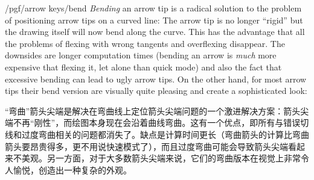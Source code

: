 \begin{key}{/pgf/arrow keys/bend}
    \emph{Bending} an arrow tip is a radical solution to the problem of
    positioning arrow tips on a curved line: The arrow tip is no longer
    ``rigid'' but the drawing itself will now bend along the curve. This has
    the advantage that all the problems of flexing with wrong tangents and
    overflexing disappear. The downsides are longer computation times (bending
    an arrow is \emph{much} more expensive that flexing it, let alone than
    quick mode) and also the fact that excessive bending can lead to ugly arrow
    tips. On the other hand, for most arrow tips their bend version are
    visually quite pleasing and create a sophisticated look:
    
    “弯曲”箭头尖端是解决在弯曲线上定位箭头尖端问题的一个激进解决方案：箭头尖端不再“刚性”，而绘图本身现在会沿着曲线弯曲。这有一个优点，即所有与错误切线和过度弯曲相关的问题都消失了。缺点是计算时间更长（弯曲箭头的计算比弯曲箭头要昂贵得多，更不用说快速模式了），而且过度弯曲可能会导致箭头尖端看起来不美观。另一方面，对于大多数箭头尖端来说，它们的弯曲版本在视觉上非常令人愉悦，创造出一种复杂的外观。
\begin{codeexample}[preamble={\usetikzlibrary{arrows.meta,bending}}]
\end{codeexample}
\begin{codeexample}[preamble={\usetikzlibrary{bending}}]
\end{codeexample}
\begin{codeexample}[preamble={\usetikzlibrary{arrows.meta,bending}}]
\end{codeexample}
\end{key}


